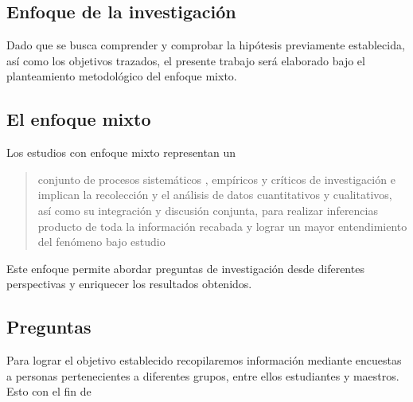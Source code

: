 \subsection{Enfoque de la investigación}
Dado que se busca comprender y comprobar la hipótesis previamente establecida,
así como los objetivos trazados, el presente trabajo será elaborado bajo el
planteamiento metodológico del enfoque mixto.
\subsection{El enfoque mixto}
Los estudios con enfoque mixto representan un 
\begin{quote}
conjunto de procesos sistemáticos , empíricos y críticos de investigación e
implican la recolección y el análisis de datos cuantitativos y cualitativos, así
como su integración y discusión conjunta, para realizar inferencias producto de
toda la información recabada y lograr un mayor entendimiento del fenómeno bajo
estudio \parencite{unitec}
\end{quote}
Este enfoque permite abordar preguntas de investigación desde diferentes
perspectivas y enriquecer los resultados obtenidos.
\subsection{Preguntas}
Para lograr el objetivo establecido recopilaremos información mediante encuestas
a personas pertenecientes a diferentes grupos, entre ellos estudiantes y
maestros. Esto con el fin de
